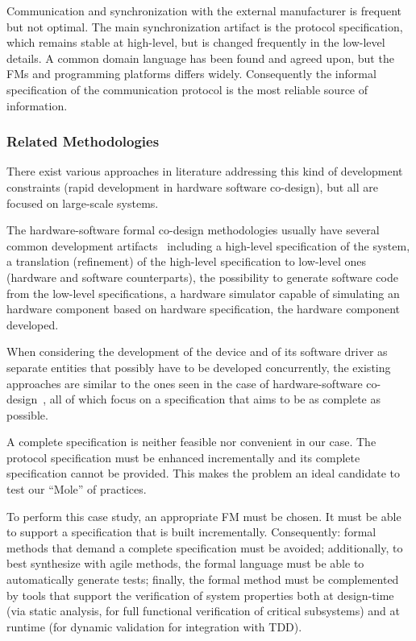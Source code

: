 \documentclass{article}
\begin{document}
Communication and synchronization with the external manufacturer is frequent but not optimal.  
The main synchronization artifact is the protocol specification, which remains stable at high-level, but is changed frequently in the low-level details.  
A common domain language has been found and agreed upon, but the FMs and programming platforms differs widely.  
Consequently the informal specification of the communication protocol is the most reliable source of information.



\subsubsection{Related Methodologies}
\label{sec:relat-meth}

There exist various approaches in literature addressing this kind of development constraints (rapid development in hardware software co-design), but all are focused on large-scale systems.  

The hardware-software formal co-design methodologies usually have several common development artifacts~\cite{Slomka2000, Hoffman2001} including a high-level specification of the system, a translation (refinement) of the high-level specification to low-level ones (hardware and software counterparts), the possibility to generate software code from the low-level specifications, a hardware simulator capable of simulating an hardware component based on hardware specification, the hardware component developed.

When considering the development of the device and of its software driver as separate entities that possibly have to be developed concurrently, the existing approaches are similar to the ones seen in the case of hardware-software co-design~\cite{Valderrama1995,Siegmund2002,Ryzhyk2009}, all of which focus on a specification that aims to be as complete as possible.

A complete specification is neither feasible nor convenient in our case. 
The protocol specification must be enhanced incrementally and its complete specification cannot be provided.  
This makes the problem an ideal candidate to test our ``Mole'' of practices.

To perform this case study, an appropriate FM must be chosen.  
It must be able to support a specification that is built incrementally.  
Consequently: formal methods that demand a complete specification must be avoided; additionally, to best synthesize with agile methods, the formal language must be able to automatically generate tests; finally, the formal method must be complemented by tools that support the verification of system properties both at design-time (via static analysis, for full functional verification of critical subsystems) and at runtime (for dynamic validation for integration with TDD).
\end{document}
